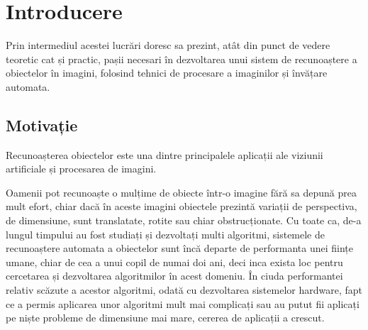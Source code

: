 \chapter{Introducere}


Prin intermediul acestei lucrări doresc sa prezint, atât din punct de vedere teoretic cat și practic, pașii necesari în dezvoltarea unui sistem de recunoaștere a obiectelor în imagini, folosind tehnici de procesare a imaginilor și învățare automata.



\section{Motivație}

Recunoașterea obiectelor este una dintre principalele aplicații ale viziunii artificiale și procesarea de imagini. 

Oamenii pot recunoaște o mulțime de obiecte într-o imagine fără sa depună prea mult efort, chiar dacă în aceste imagini obiectele prezintă variații de perspectiva, de dimensiune, sunt translatate, rotite sau chiar obstrucționate. 
Cu toate ca, de-a lungul timpului au fost studiați și dezvoltați multi algoritmi, sistemele de recunoaștere automata a obiectelor sunt încă departe de performanta unei ființe umane, chiar de cea a unui copil de numai doi ani, deci inca exista loc pentru cercetarea și dezvoltarea algoritmilor în acest domeniu.
În ciuda performantei relativ scăzute a acestor algoritmi, odată cu dezvoltarea sistemelor hardware, fapt ce a permis aplicarea unor algoritmi mult mai complicați sau au putut fii aplicați pe niște probleme de dimensiune mai mare, cererea de aplicații a crescut. 

